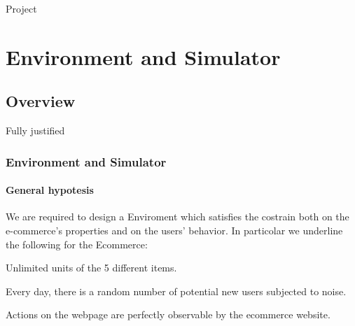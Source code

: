 \documentclass{beamer}
\begin{document}
\frame{\titlepage}

\begin{frame}{Project}
    \tableofcontents[hideallsubsections]
\end{frame}


\AtBeginSection[]
{
\begin{frame}{}
    \tableofcontents[currentsection]
\end{frame}
}


\section{Environment and Simulator}
\subsection{Overview}


\begin {frame} {Fully justified}

\frametitle{Environment and Simulator}
\framesubtitle{General hypotesis}

We are required to design a Enviroment which satisfies the costrain both on the e-commerce's properties and on the users' behavior. 
In particolar we underline the following for the Ecommerce:
\vspace{0.3cm}
\begin{list}{-}{\setlength{\itemsep}{0.3cm}}
    \item Unlimited units of the 5 different items.
    \item Every day, there is a random number of potential new users subjected to noise.
    \item Actions on the webpage are perfectly observable by the ecommerce website.
\end{list}
\vspace{0.5cm}

\end {frame}


\end{document}
